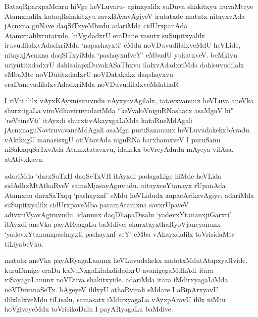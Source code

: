 \begin{artha}
BataqRparxpaMcaru hiVge heVLuvaru- aginxyalilx suDuva shakitxyu iruvaMteye Atamxnalilx kataqRshakitxyu savxBAvavAgiyeV irutatxde matutx nitayxvAda jAcnxna guNave daqSiTxyeMbudu adariMda cidUrxpanAda Atamxnalilxrutatxde. hiVgidadxrU eraDane vasutx suSupitxyalilx iruvudilalxvAdadxriMda `napashayxti' eMdu noVDuvudilalxveMdU heVLide, nitayxjAcnxna daqSiTxyiMda `pashayxnfveY' eMbudU yukatxveV. beMkiyu uriyutitxdadxrU dahisalapxDuvakASaThxvu ilalxvAdadxriMda dahisuvudilalx eMbaMte noVDutitxdadxrU noVDatakakx daqshayxvu eraDaneyadilalxvAdadx\-\break riMda noVDuvudilalxveMdathaR-
\end{artha}


\begin{artha}
I riVti ililx vAyxKAyxnisiruvudu nAyxyavAgilalx, tatavxvanunx heVLuva aneVka shurxtigaLa viroVdhaviruvudariMda ``keVvaloV\-\break niguRNashacx asaMgoV hi" `neVtineVti' itAyxdi shurxtivAkayxgaLiMda kataRneMdAgali jAcnxnaguNaviruvavaneMdAgali asaMga puruSananunx heVLuvudakekxbAradu. vAkikxgU manasisxgU atiVtavAda niguRNa barxhamxveV I puruSanu niSakxqqSaTxvAda Atamxtatavxvu, idakekx beVreyAdudu mAyeya vilAsa, atAtivxkavu. 
\end{artha}

\begin{artha}
adariMda `darxSuTxH daqSeTxVH itAyxdi padagaLige hiMde heVLida sidAdhxMtAthaRveV samaMjasavAguvudu. nitayxceYtanayx rUpanAda Atamxnu darxSaTxqq `pashayxnf' eMdu heVLidudx aupacArikavAgiye. adariMda suSupitxyalilx cidUrxpaveMba paramAtamxna savxrUpaveV adivxtiVyavAgiruvudu. idanunx daqDhapaDisalu `yadevxYtananxjiGarxti' itAyxdi aneVka payARyagaLu baMdive; shurxtayxthaRyoVjaneyanunx `yadevxYtananxpashayxti pashayxnf veY' eMba vAkayxdalilx toVrisidaMte tiLiyabeVku. 
\end{artha}

\begin{artha}
matutx aneVka payARyagaLanunx heVLuvudakekx matotxMdu\break tAtapxyaRvide. kuruDanige eraDu kaNuNxgaLilalxdidadxrU avanige\break gaMdhAdi itara viSayagaLanunx noVDuva shakitxyide. adariMda itara iMdirxyagaLiMda noVDuvanaSeTx. hAgeyeV ililxyU athaRvirali eMdare I aBipArxyavU ililxlalxveMdu tiLisalu, samasatx iMdirxyagaLa vAyxpAravU ililx niMtu hoVgiveyeMdu toVrisikoDalu I payARyagaLu baMdive. 
\end{artha}

